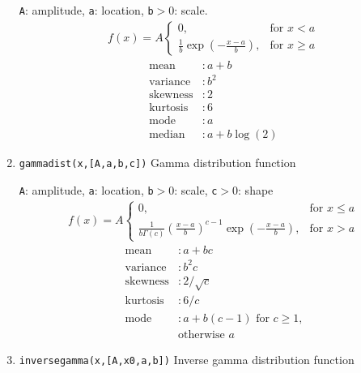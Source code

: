 \documentclass[reprint,showpacs,prb,nofootinbib,amsmath,amssymb]{revtex4-1}
\begin{document}
\begin{enumerate}
\verb|A|: amplitude, \verb|a|: location, \verb|b|$>0$: scale. 
\begin{eqnarray}
f(x)=A
\begin{cases}
0, &\text{for }x<a \\
\frac{1}{b}\exp\left(-\frac{x-a}{b}\right), &\text{for }x\geq a  \nonumber
\end{cases}
\end{eqnarray}
\begin{align}
	\mbox{mean} 		&: \mbox{$a+b$} \nonumber \\
	\mbox{variance}		&: \mbox{$b^2$} \nonumber \\
	\mbox{skewness} 	&: \mbox{$2$} \nonumber \\	
	\mbox{kurtosis} 	&: \mbox{$6$} \nonumber \\	
	\mbox{mode}         &: \mbox{$a$}  \nonumber \\
	\mbox{median}       &: \mbox{$a+b\log(2)$}  \nonumber
\end{align}

\item \verb|gammadist(x,[A,a,b,c])| Gamma distribution function~\cite{McLaughlin}

\verb|A|: amplitude, \verb|a|: location, \verb|b|$>0$: scale, \verb|c|$>0$: shape
\begin{eqnarray}
f(x)=A
\begin{cases}
0, &\text{for }x\leq a \\
\frac{1}{b\Gamma(c)}\left(\frac{x-a}{b}\right)^{c-1}\exp\left(-\frac{x-a}{b}\right), &\text{for }x>a  \nonumber
\end{cases}
\end{eqnarray}
\begin{align}
	\mbox{mean} 		&: \mbox{$a+bc$} \nonumber \\
	\mbox{variance}		&: \mbox{$b^2c$} \nonumber \\
	\mbox{skewness} 	&: \mbox{$2/\sqrt{c}$} \nonumber \\	
	\mbox{kurtosis} 	&: \mbox{$6/c$} \nonumber \\	
	\mbox{mode}         &: \mbox{$a+b(c-1)$ for $c\geq 1$,}  \nonumber \\
	\mbox{}         	& \mbox{otherwise $a$}  \nonumber
\end{align}

\item \verb|inversegamma(x,[A,x0,a,b])| Inverse gamma distribution function~\cite{McLaughlin,inversegamma}


\end{enumerate}
\end{document}

